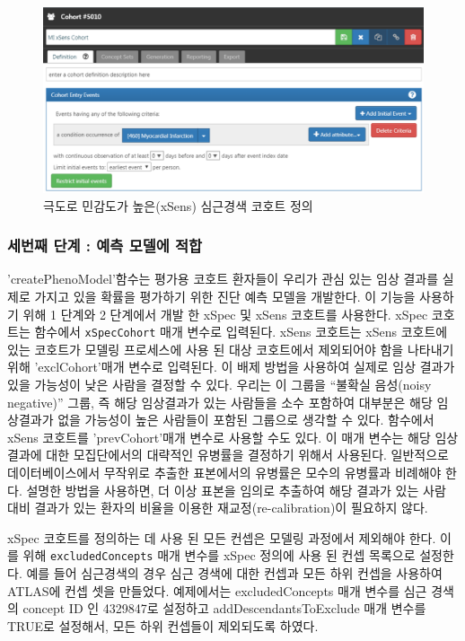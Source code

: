 \documentclass[10.5pt]{book}
\theoremstyle{definition}
\theoremstyle{definition}
\theoremstyle{definition}
\theoremstyle{remark}
\begin{document}
\begin{figure}

{\centering \includegraphics[width=1\linewidth]{images/ClinicalValidity/xSens} 

}

\caption{극도로 민감도가 높은(xSens) 심근경색 코호트 정의}\label{fig:xSens}
\end{figure}

\subsubsection*{세번째 단계 : 예측 모델에 적합}\label{----}

'createPhenoModel'함수는 평가용 코호트 환자들이 우리가 관심 있는 임상
결과를 실제로 가지고 있을 확률을 평가하기 위한 진단 예측 모델을
개발한다. 이 기능을 사용하기 위해 1 단계와 2 단계에서 개발 한 xSpec 및
xSens 코호트를 사용한다. xSpec 코호트는 함수에서 \texttt{xSpecCohort}
매개 변수로 입력된다. xSens 코호트는 xSens 코호트에 있는 코호트가 모델링
프로세스에 사용 된 대상 코호트에서 제외되어야 함을 나타내기 위해
'exclCohort'매개 변수로 입력된다. 이 배제 방법을 사용하여 실제로 임상
결과가 있을 가능성이 낮은 사람을 결정할 수 있다. 우리는 이 그룹을
``불확실 음성(noisy negative)'' 그룹, 즉 해당 임상결과가 있는 사람들을
소수 포함하여 대부분은 해당 임상결과가 없을 가능성이 높은 사람들이
포함된 그룹으로 생각할 수 있다. 함수에서 xSens 코호트를 'prevCohort'매개
변수로 사용할 수도 있다. 이 매개 변수는 해당 임상 결과에 대한
모집단에서의 대략적인 유병률을 결정하기 위해서 사용된다. 일반적으로
데이터베이스에서 무작위로 추출한 표본에서의 유병률은 모수의 유병률과
비례해야 한다. 설명한 방법을 사용하면, 더 이상 표본을 임의로 추출하여
해당 결과가 있는 사람 대비 결과가 있는 환자의 비율을 이용한
재교정(re-calibration)이 필요하지 않다.

xSpec 코호트를 정의하는 데 사용 된 모든 컨셉은 모델링 과정에서 제외해야
한다. 이를 위해 \texttt{excludedConcepts} 매개 변수를 xSpec 정의에 사용
된 컨셉 목록으로 설정한다. 예를 들어 심근경색의 경우 심근 경색에 대한
컨셉과 모든 하위 컨셉을 사용하여 ATLAS에 컨셉 셋을 만들었다. 예제에서는
excludedConcepts 매개 변수를 심근 경색의 concept ID 인 4329847로
설정하고 addDescendantsToExclude 매개 변수를 TRUE로 설정해서, 모든 하위
컨셉들이 제외되도록 하였다.
\end{document}
